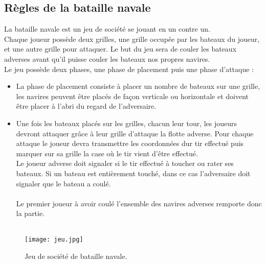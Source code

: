 \documentclass[12pt]{report}
\begin{document}
	\subsection{Règles de la bataille navale}
	La bataille navale est un jeu de société se jouant en un contre un.\\
	Chaque joueur possède deux grilles, une grille occupée par les bateaux du joueur, et une autre grille pour attaquer.
	Le but du jeu sera de couler les bateaux adverses avant qu'il puisse couler les bateaux nos propres navires.\\
	Le jeu possède deux phases, une phase de placement puis une phase d'attaque :
	\begin{itemize}
	\itemsep0em 
	\item La phase de placement consiste à placer un nombre de bateaux sur une grille, les navires peuvent être placés de façon verticale ou horizontale et doivent être placer à l'abri du regard de l'adversaire.
	\item Une fois les bateaux placés sur les grilles, chacun leur tour, les joueurs devront attaquer grâce à leur grille d'attaque la flotte adverse. Pour chaque attaque le joueur devra transmettre les coordonnées dur tir effectué puis marquer sur sa grille la case où le tir vient d'être effectué.\\
	Le joueur adverse doit signaler si le tir effectué à toucher ou rater ses bateaux. Si un bateau est entièrement touché, dans ce cas l'adversaire doit signaler que le bateau a coulé.\\\\
	Le premier joueur à avoir coulé l'ensemble des navires adverses remporte donc la partie.\\\\
	\end{itemize}
	\begin{figure}[h]
    	\begin{center}
		\texttt{[image: jeu.jpg]}
		\caption{Jeu de société de bataille navale.}
		\end{center}
	\end{figure}
\end{document}
